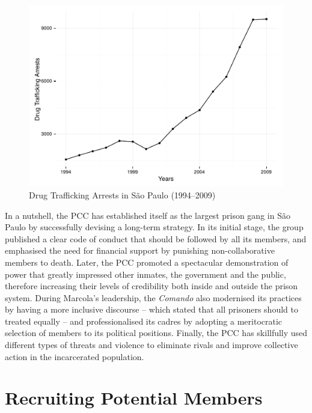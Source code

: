 \begin{center}
\begin{figure}[bth!]
\includegraphics[height = 8cm, width = 1\linewidth]{gfx/fig8}
\caption[Drug Trafficking Arrests in S\~{a}o Paulo (1994--2009)]{Drug Trafficking Arrests in S\~{a}o Paulo (1994--2009)}
\label{fig:fig8}
\end{figure}
\end{center}


In a nutshell, the PCC has established itself as the largest prison gang in S\~{a}o Paulo by successfully devising a long-term strategy. In its initial stage, the group published a clear code of conduct that should be followed by all its members, and emphasised the need for financial support by punishing non-collaborative members to death. Later, the PCC promoted a spectacular demonstration of power that greatly impressed other inmates, the government and the public, therefore increasing their levels of credibility both inside and outside the prison system. During Marcola's leadership, the \textit{Comando} also modernised its practices by having a more inclusive discourse -- which stated that all prisoners should to treated equally -- and professionalised its cadres by adopting a meritocratic selection of members to its political positions. Finally, the PCC has skillfully used different types of threats and violence to eliminate rivals and improve collective action in the incarcerated population.

\section{Recruiting Potential Members}

